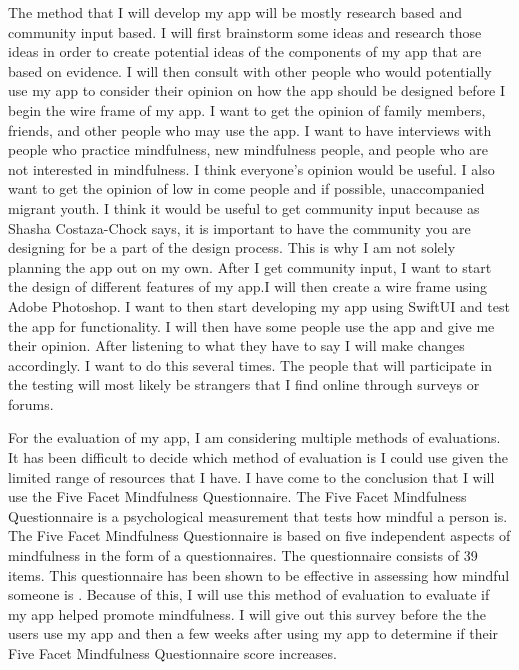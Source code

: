 \documentclass[12pt,twocolumn]{article}
\begin{document}
The method that I will develop my app will be mostly research based and community input based. I will first brainstorm some ideas and research those ideas in order to create potential ideas of the components of my app that are based on evidence. I will then consult with other people who would potentially use my app to consider their opinion on how the app should be designed before I begin the wire frame of my app. I want to get the opinion of family members, friends, and other people who may use the app. I want to have interviews with people who practice mindfulness, new mindfulness people, and people who are not interested in mindfulness. I think everyone's opinion would be useful. I also want to get the opinion of low in come people and if possible, unaccompanied migrant youth. I think it would be useful to get community input because as Shasha Costaza-Chock says, it is important to have the community you are designing for be a part of the design process. This is why I am not solely planning the app out on my own. After I get community input, I want to start the design of different features of my app.I will then create a wire frame using Adobe Photoshop. I want to then start developing my app using SwiftUI and test the app for functionality. I will then have some people use the app and give me their opinion. After listening to what they have to say I will make changes accordingly. I want to do this several times. The people that will participate in the testing will most likely be strangers that I find online through surveys or forums.


For the evaluation of my app, I am considering multiple methods of evaluations. It has been difficult to decide which method of evaluation is I could use given the limited range of resources that I have. I have come to the conclusion that I will use the Five Facet Mindfulness Questionnaire. The Five Facet Mindfulness Questionnaire is a psychological measurement that tests how mindful a person is. The Five Facet Mindfulness Questionnaire is based on five independent aspects of mindfulness in the form of a questionnaires. The questionnaire consists of 39 items. This questionnaire has been shown to be effective in assessing how mindful someone is \cite{choi26}. Because of this, I will use this method of evaluation to evaluate if my app helped promote mindfulness. I will give out this survey before the the users use my app and then a few weeks after using my app to determine if their Five Facet Mindfulness Questionnaire score increases. 
\end{document}
